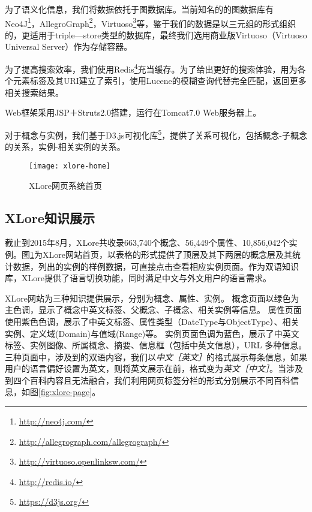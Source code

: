 为了语义化信息，我们将数据依托于图数据库。当前知名的的图数据库有Neo4J\footnote{\url{http://neo4j.com/}}，AllegroGraph\footnote{\url{http://allegrograph.com/allegrograph/}}，Virtuoso\footnote{\url{http://virtuoso.openlinksw.com/}}等，鉴于我们的数据是以三元组的形式组织的，更适用于triple—store类型的数据库，最终我们选用商业版Virtuoso（Virtuoso Universal Server）作为存储容器。


为了提高搜索效率，我们使用Redis\footnote{\url{http://redis.io/}}充当缓存。为了给出更好的搜索体验，用为各个元素标签及其URI建立了索引，使用Lucene的模糊查询代替完全匹配，返回更多相关搜索结果。

Web框架采用JSP＋Struts2.0搭建，运行在Tomcat7.0 Web服务器上。

对于概念与实例，我们基于D3.js可视化库\footnote{\url{https://d3js.org/}}，提供了关系可视化，包括概念-子概念的关系，实例-相关实例的关系。

\begin{figure}[ht]
  \centering
  \texttt{[image: xlore-home]}
  \caption{XLore网页系统首页}
  \label{fig:xlore-home}
\end{figure}

\subsection{XLore知识展示}
截止到2015年8月，XLore共收录663,740个概念、56,449个属性、10,856,042个实例。图\ref{fig:xlore-home}为XLore网站首页，以表格的形式提供了顶层及其下两层的概念层及其统计数据，列出的实例的样例数据，可直接点击查看相应实例页面。作为双语知识库，XLore提供了语言切换功能，同时满足中文与外文用户的语言需求。

XLore网站为三种知识提供展示，分别为概念、属性、实例。
概念页面以绿色为主色调，显示了概念中英文标签、父概念、子概念、相关实例等信息。
属性页面使用紫色色调，展示了中英文标签、属性类型（DateType与ObjectType）、相关实例、定义域(Domain)与值域(Range)等。
实例页面色调为蓝色，展示了中英文标签、实例图像、所属概念、摘要、信息框（包括中英文信息），URL 多种信息。三种页面中，涉及到的双语内容，我们以\textit{中文［英文］}的格式展示每条信息，如果用户的语言偏好设置为英文，则将英文展示在前，格式变为\textit{英文［中文］}。当涉及到四个百科内容且无法融合，我们利用网页标签分栏的形式分别展示不同百科信息，如图\ref{fig:xlore-page}。

